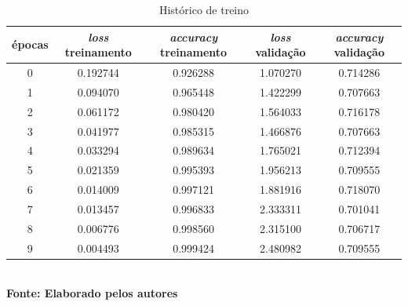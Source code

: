 \begin{table}[h]
  \centering
  \caption{Histórico de treino}
   \label{tab:history10}
   \vspace{-0.2cm}
\begin{tabular}{|c|c|c|c|c|} 
  \hline
   épocas & \textit{loss} treinamento & \textit{accuracy} treinamento & \textit{loss} validação & \textit{accuracy} validação \\
  \hline
    0 & 0.192744 & 0.926288 & 1.070270 & 0.714286 \\
    1 & 0.094070 & 0.965448 & 1.422299 & 0.707663 \\
    2 & 0.061172 & 0.980420 & 1.564033 & 0.716178 \\
    3 & 0.041977 & 0.985315 & 1.466876 & 0.707663 \\
    4 & 0.033294 & 0.989634 & 1.765021 & 0.712394 \\
    5 & 0.021359 & 0.995393 & 1.956213 & 0.709555 \\
    6 & 0.014009 & 0.997121 & 1.881916 & 0.718070 \\
    7 & 0.013457 & 0.996833 & 2.333311 & 0.701041 \\
    8 & 0.006776 & 0.998560 & 2.315100 & 0.706717 \\
    9 & 0.004493 & 0.999424 & 2.480982 & 0.709555 \\
  \hline
\end{tabular}
	\vspace{0.2cm}
     \\\textbf{\footnotesize Fonte: Elaborado pelos autores}
\end{table}


